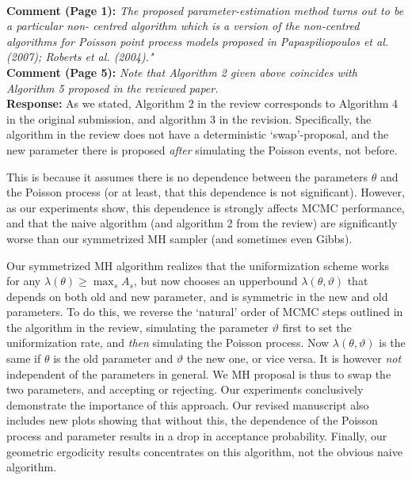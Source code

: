 \documentclass[11pt]{article}
\newcommand{\rev}[2]{\textbf{Comment #1: }\emph{#2}}
\newcommand{\resp}{\textbf{Response: }}
\begin{document}
~\\
\rev{(Page 1)}{The proposed parameter-estimation method turns out to be a particular non- centred algorithm which is a version of the non-centred algorithms for Poisson point process models proposed in Papaspiliopoulos et al. (2007); Roberts et al.  (2004)."}\\
\rev {(Page 5)}{Note that Algorithm 2 given above coincides with Algorithm 5 proposed in the reviewed paper.}\\
\resp
As we stated, Algorithm 2 in the review corresponds to Algorithm 4 in the original submission, and algorithm 3 in the revision. Specifically, the algorithm in the review does not have a deterministic `swap'-proposal, and the new parameter there is proposed {\em after} simulating the Poisson events, not before.

This is because it assumes there is no dependence between the parameters $\theta$ and the Poisson process (or at least, that this dependence is not significant). However, as our experiments show, this dependence is strongly affects MCMC performance, and that the  naive algorithm (and algorithm 2 from the review) are significantly worse than our symmetrized MH sampler (and sometimes even Gibbs).

Our symmetrized MH algorithm  realizes that the uniformization scheme works for any $\lambda(\theta) \ge \max_s A_s$, but now chooses an upperbound $\lambda(\theta, \vartheta)$ that depends on both old and new parameter, and is symmetric in the new and old parameters. 
To do this, we reverse the `natural' order of MCMC steps outlined in the algorithm in the review, simulating the parameter $\vartheta$ first to set the uniformization rate, and \emph{then} simulating the Poisson process. 
Now $\lambda(\theta,\vartheta)$ is the same if $\theta$ is the old parameter and $\vartheta$ the new one, or vice versa. It is however \emph{not} independent of the parameters in general.
We MH proposal is thus to swap the two parameters, and accepting or rejecting.
Our experiments conclusively demonstrate the importance of this approach. Our revised manuscript also includes new plots showing that without this, the dependence of the Poisson process and parameter results in a drop in acceptance probability. Finally, our geometric ergodicity results concentrates on this algorithm, not the obvious naive algorithm.
\end{document}
